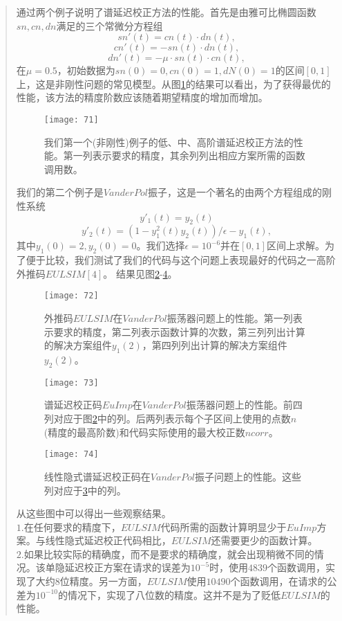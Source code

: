 \documentclass{article}
\begin{document}
\begin{CJK}{UTF8}{gkai}
\begin{quotation}
通过两个例子说明了谱延迟校正方法的性能。首先是由雅可比椭圆函数$sn,cn,dn$满足的三个常微分方程组\\
$$ sn'(t)=cn(t) \cdot dn(t),$$
$$cn'(t)=-sn(t) \cdot dn(t),$$
$$dn'(t)= -\mu \cdot sn(t) \cdot cn(t),$$
在$\mu=0.5$，初始数据为$sn(0)=0,cn(0)=1,dN(0)=1$的区间$[0,1]$上，这是非刚性问题的常见模型。从图\ref{7.1}的结果可以看出，为了获得最优的性能，该方法的精度阶数应该随着期望精度的增加而增加。\\
\begin{figure}[h]
	\centering
	\texttt{[image: 71]}
	\caption{我们第一个(非刚性)例子的低、中、高阶谱延迟校正方法的性能。第一列表示要求的精度，其余列列出相应方案所需的函数调用数。}
	\label{7.1}
\end{figure}
我们的第二个例子是$Van der Pol$振子，这是一个著名的由两个方程组成的刚性系统\\
$$y'_1(t)=y_2(t)$$
$$y'_2(t)=(1-y_1^2(t)y_2(t))/ \epsilon -y_1(t),$$
其中$y_1(0)=2,y_2(0)=0$。我们选择$\epsilon=10^{-6}$并在$[0,1]$区间上求解。为了便于比较，我们测试了我们的代码与这个问题上表现最好的代码之一高阶外推码$EULSIM[4]$。 结果见图\ref{72}-\ref{74}。\\
\begin{figure}[h]
	\centering
	\texttt{[image: 72]}
	\caption{外推码$EULSIM$在$Van der Pol$振荡器问题上的性能。第一列表示要求的精度，第二列表示函数计算的次数，第三列列出计算的解决方案组件$y_1(2)$，第四列列出计算的解决方案组件$y_2(2)$。}
	\label{72}
\end{figure}
\begin{figure}[h]
	\centering
	\texttt{[image: 73]}
	\caption{谱延迟校正码$EuImp$在$Van der Pol$振荡器问题上的性能。前四列对应于图\ref{72}中的列。后两列表示每个子区间上使用的点数$n$(精度的最高阶数)和代码实际使用的最大校正数$ncorr$。}
	\label{73}
\end{figure}
\begin{figure}[h]
	\centering
	\texttt{[image: 74]}
	\caption{线性隐式谱延迟校正码在$Van der Pol$振子问题上的性能。这些列对应于\ref{73}中的列。}
	\label{74}
\end{figure}
从这些图中可以得出一些观察结果。\\

$1$.在任何要求的精度下，$EULSIM$代码所需的函数计算明显少于$EuImp$方案。与线性隐式延迟校正代码相比，$EULSIM$还需要更少的函数计算。\\

$2$.如果比较实际的精确度，而不是要求的精确度，就会出现稍微不同的情况。该单隐延迟校正方案在请求的误差为$10^{-5}$时，使用$4839$个函数调用，实现了大约8位精度。另一方面，$EULSIM$使用$10490$个函数调用，在请求的公差为$10^{-10}$的情况下，实现了八位数的精度。这并不是为了贬低$EULSIM$的性能。\\


\end{quotation}
\end{CJK}
\end{document}
